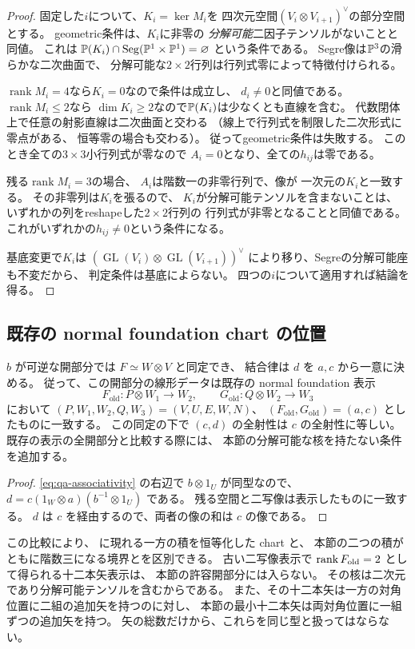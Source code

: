 \begin{proof}
固定した$i$について、$K_i=\ker M_i$を
四次元空間$(V_i\otimes V_{i+1})^\vee$の部分空間とする。
geometric条件は、$K_i$に非零の
\emph{分解可能}二因子テンソルがないことと同値。
これは
$\mathbb P(K_i)\cap\operatorname{Seg}(\mathbb P^1\times\mathbb P^1)=\varnothing$
という条件である。
Segre像は$\mathbb P^3$の滑らかな二次曲面で、
分解可能な$2\times2$行列は行列式零によって特徴付けられる。

$\operatorname{rank}M_i=4$なら$K_i=0$なので条件は成立し、
$d_i\ne0$と同値である。
$\operatorname{rank}M_i\le2$なら
$\dim K_i\ge2$なので$\mathbb P(K_i)$は少なくとも直線を含む。
代数閉体上で任意の射影直線は二次曲面と交わる
（線上で行列式を制限した二次形式に零点がある、
恒等零の場合も交わる）。
従ってgeometric条件は失敗する。
このとき全ての$3\times3$小行列式が零なので
$A_i=0$となり、全ての$h_{ij}$は零である。

残る$\operatorname{rank}M_i=3$の場合、
$A_i$は階数一の非零行列で、像が
一次元の$K_i$と一致する。
その非零列は$K_i$を張るので、
$K_i$が分解可能テンソルを含まないことは、
いずれかの列をreshapeした$2\times2$行列の
行列式が非零となることと同値である。
これがいずれかの$h_{ij}\ne0$という条件になる。

基底変更で$K_i$は
$(\operatorname{GL}(V_i)\otimes\operatorname{GL}(V_{i+1}))^\vee$
により移り、Segreの分解可能座も不変だから、
判定条件は基底によらない。
四つの$i$について適用すれば結論を得る。
\end{proof}

\subsection{既存の normal foundation chart の位置}

\begin{proposition}[一方の積を可逆にした表示]
\label{prop:qa-existing-foundation-chart}
\(b\) が可逆な開部分では \(F\simeq W\otimes V\) と同定でき、
結合律は \(d\) を \(a,c\) から一意に決める。
従って、この開部分の線形データは既存の normal foundation 表示
\[
 F_{\mathrm{old}}:P\otimes W_1\to W_2,
 \qquad G_{\mathrm{old}}:Q\otimes W_2\to W_3
\]
において
\((P,W_1,W_2,Q,W_3)=(V,U,E,W,N)\)、
\((F_{\mathrm{old}},G_{\mathrm{old}})=(a,c)\) としたものに一致する。
この同定の下で \((c,d)\) の全射性は \(c\) の全射性に等しい。
既存の表示の全開部分と比較する際には、
本節の分解可能な核を持たない条件を追加する。
\end{proposition}
\begin{proof}
\eqref{eq:qa-associativity} の右辺で \(b\otimes1_U\) が同型なので、
\(d=c(1_W\otimes a)(b^{-1}\otimes1_U)\) である。
残る空間と二写像は表示したものに一致する。
\(d\) は \(c\) を経由するので、両者の像の和は \(c\) の像である。
\end{proof}

この比較により、\cite[\texttt{prop:foundation-stack}]{QuadricModuli2026} に現れる一方の積を恒等化した chart と、
本節の二つの積がともに階数三になる境界とを区別できる。
古い二写像表示で \(\operatorname{rank} F_{\mathrm{old}}=2\) として得られる十二本矢表示は、
本節の許容開部分には入らない。
その核は二次元であり分解可能テンソルを含むからである。
また、その十二本矢は一方の対角位置に二組の追加矢を持つのに対し、
本節の最小十二本矢は両対角位置に一組ずつの追加矢を持つ。
矢の総数だけから、これらを同じ型と扱ってはならない。
